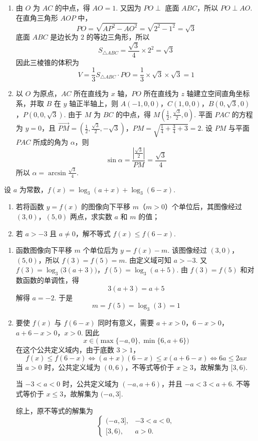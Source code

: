 \begin{solution}
\begin{enumerate}
\item 由 \(O\) 为 \(AC\) 的中点，得 \(AO=1\). 又因为 \(PO\perp\) 底面 \(ABC\)，所以 \(PO\perp AO\). 在直角三角形 \(AOP\) 中，
\[
PO=\sqrt{AP^2-AO^2}=\sqrt{2^2-1^2}=\sqrt3
\]
底面 \(ABC\) 是边长为 \(2\) 的等边三角形，所以
\[
S_{\triangle ABC}=\frac{\sqrt3}{4}\times2^2=\sqrt3
\]
因此三棱锥的体积为
\[
V=\frac13S_{\triangle ABC}\cdot PO=\frac13\times\sqrt3\times\sqrt3=1
\]

\item 以 \(O\) 为原点，\(AC\) 所在直线为 \(x\) 轴，\(PO\) 所在直线为 \(z\) 轴建立空间直角坐标系，并取 \(B\) 在 \(y\) 轴正半轴上，则
\(A(-1,0,0)\)，\(C(1,0,0)\)，\(B(0,\sqrt3,0)\)，\(P(0,0,\sqrt3)\).
由于 \(M\) 为 \(BC\) 的中点，得 \(M\left(\frac12,\frac{\sqrt3}{2},0\right)\). 平面 \(PAC\) 的方程为 \(y=0\)，且
\(\overrightarrow{PM}=\left(\frac12,\frac{\sqrt3}{2},-\sqrt3\right)\)，\(PM=\sqrt{\frac14+\frac34+3}=2\).
设 \(PM\) 与平面 \(PAC\) 所成的角为 \(\alpha\)，则
\[
\sin\alpha=\frac{\left|\frac{\sqrt3}{2}\right|}{PM}=\frac{\sqrt3}{4}
\]
所以 \(\alpha=\arcsin\frac{\sqrt3}{4}\).
\end{enumerate}
\end{solution}

\begin{problem}
设 \(a\) 为常数，\(f(x)=\log_3(a+x)+\log_3(6-x)\).
\begin{enumerate}
\item 若将函数 \(y=f(x)\) 的图像向下平移 \(m\)（\(m>0\)）个单位后，其图像经过 \((3,0)\)，\((5,0)\) 两点，求实数 \(a\) 和 \(m\) 的值；
\item 若 \(a>-3\) 且 \(a\ne0\)，解不等式 \(f(x)\le f(6-x)\).
\end{enumerate}
\end{problem}

\begin{solution}
\begin{enumerate}
\item 函数图像向下平移 \(m\) 个单位后为 \(y=f(x)-m\). 该图像经过 \((3,0)\)，\((5,0)\)，所以 \(f(3)=f(5)=m\). 由定义域可知 \(a>-3\). 又
\(f(3)=\log_3\bigl(3(a+3)\bigr)\)，\(f(5)=\log_3(a+5)\).
由 \(f(3)=f(5)\) 和对数函数的单调性，得
\[
3(a+3)=a+5
\]
解得 \(a=-2\). 于是
\[
m=f(5)=\log_3(3)=1
\]

\item 要使 \(f(x)\) 与 \(f(6-x)\) 同时有意义，需要
\(a+x>0\)，\(6-x>0\)，\(a+6-x>0\)，\(x>0\).
因此
\[
x\in\bigl(\max\{-a,0\},\min\{6,a+6\}\bigr)
\]
在这个公共定义域内，由于底数 \(3>1\)，
\[
f(x)\le f(6-x)\Longleftrightarrow (a+x)(6-x)\le x(a+6-x)\Longleftrightarrow 6a\le2ax
\]
当 \(a>0\) 时，公共定义域为 \((0,6)\)，不等式等价于 \(x\ge3\)，故解集为 \([3,6)\).

当 \(-3<a<0\) 时，公共定义域为 \((-a,a+6)\)，并且 \(-a<3<a+6\). 不等式等价于 \(x\le3\)，故解集为 \((-a,3]\).

综上，原不等式的解集为
\[
\begin{cases}
(-a,3],&-3<a<0,\\
[3,6),&a>0.
\end{cases}
\]
\end{enumerate}
\end{solution}

